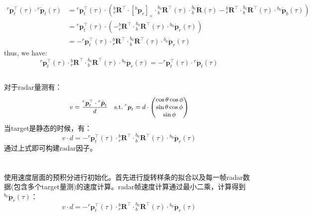 \documentclass[12pt, onecolumn]{article}
\newcommand\normf{\fangsong}
\newcommand\liehat[1]{\left[ #1 \right]_\times}
\begin{document}
		\begin{equation}
		\begin{aligned}
		{^{r}\boldsymbol{p}_t^\top(\tau)}\cdot{^{r}\dot{\boldsymbol{p}}_t(\tau)}
		&={^{r}\boldsymbol{p}_t^\top(\tau)}\cdot\left( {^{b}_{r}\boldsymbol{R}^\top}\cdot\liehat{{^{b}\boldsymbol{p}_{r}}}\cdot{^{b_0}_{b}\boldsymbol{R}^\top(\tau)}\cdot{^{b_0}_{b}\dot{\boldsymbol{R}}(\tau)}			-{^{b}_{r}\boldsymbol{R}^\top}\cdot{^{b_0}_{b}\boldsymbol{R}^\top(\tau)}\cdot{^{b_0}\dot{\boldsymbol{p}}_{b}(\tau)}\right) 
		\\
		&={^{r}\boldsymbol{p}_t^\top(\tau)}\cdot\left(
		-{^{b}_{r}\boldsymbol{R}^\top}\cdot{^{b_0}_{b}\boldsymbol{R}^\top(\tau)}\cdot{^{b_0}\dot{\boldsymbol{p}}_r(\tau)}
		\right) 
		\\&=-{^{r}\boldsymbol{p}_t^\top(\tau)}\cdot{^{b}_{r}\boldsymbol{R}^\top}\cdot{^{b_0}_{b}\boldsymbol{R}^\top(\tau)}\cdot{^{b_0}\dot{\boldsymbol{p}}_r(\tau)}
		\end{aligned}
		\end{equation}
		thus, we have:
		\begin{equation}
		{^{r}\boldsymbol{p}_t^\top(\tau)}\cdot{^{b}_{r}\boldsymbol{R}^\top}\cdot{^{b_0}_{b}\boldsymbol{R}^\top(\tau)}\cdot{^{b_0}\dot{\boldsymbol{p}}_r(\tau)}=
		-{^{r}\boldsymbol{p}_t^\top(\tau)}\cdot{^{r}\dot{\boldsymbol{p}}_t(\tau)}
		\end{equation}
		\subsection{\normf{因子构建}}
		对于radar量测有：
			\begin{equation}
			\label{equ:radar_model}
			\small
			v=
			\frac{{^{r}\boldsymbol{p}_t^\top}\cdot{^{r}\dot{\boldsymbol{p}}_t}}{d}
			\quad\mathrm{s.t.}\;
			{^{r}\boldsymbol{p}_t}=d\cdot\begin{pmatrix}
			\cos\theta\cos\phi
			\\
			\sin\theta\cos\phi
			\\
			\sin\phi
			\end{pmatrix}
			\end{equation}
		当target是静态的时候，有：
		\begin{equation}
		v\cdot d=-{^{r}\boldsymbol{p}_t^\top(\tau)}\cdot{^{b}_{r}\boldsymbol{R}^\top}\cdot{^{b_0}_{b}\boldsymbol{R}^\top(\tau)}\cdot{^{b_0}\dot{\boldsymbol{p}}_r(\tau)}
		\end{equation}
		通过上式即可构建radar因子。
		
		\section{\normf{初始化}}
		使用速度层面的预积分进行初始化。首先进行旋转样条的拟合以及每一帧radar数据(包含多个target量测)的速度计算。radar帧速度计算通过最小二乘，计算得到${^{b_0}\dot{\boldsymbol{p}}_r(\tau)}$：
		\begin{equation}
		v\cdot d=-
		{^{r}\boldsymbol{p}_t^\top(\tau)}\cdot{^{b}_{r}\boldsymbol{R}^\top}\cdot{^{b_0}_{b}\boldsymbol{R}^\top}(\tau)\cdot{^{b_0}\dot{\boldsymbol{p}}_r(\tau)}
		\end{equation}
		
\end{document}
